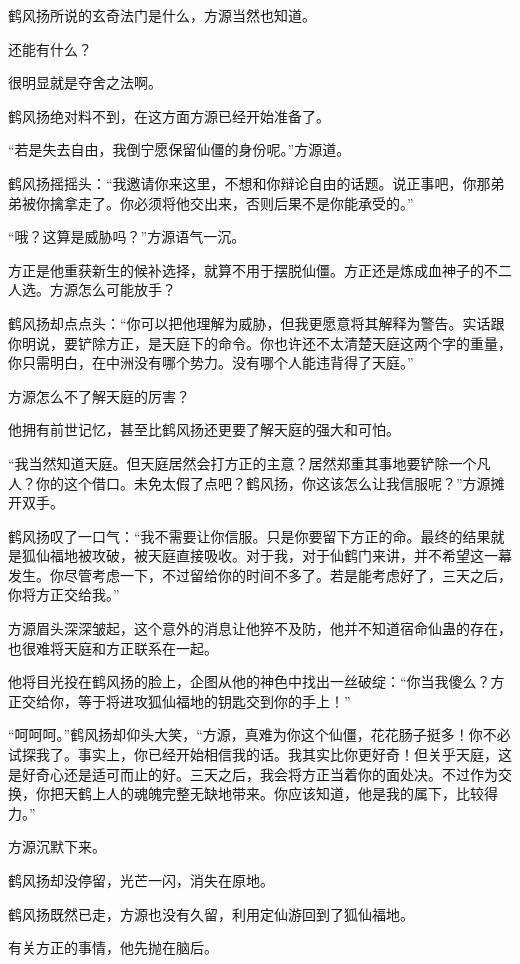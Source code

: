 \begin{this_body}
鹤风扬所说的玄奇法门是什么，方源当然也知道。

还能有什么？

很明显就是夺舍之法啊。

鹤风扬绝对料不到，在这方面方源已经开始准备了。

“若是失去自由，我倒宁愿保留仙僵的身份呢。”方源道。

鹤风扬摇摇头：“我邀请你来这里，不想和你辩论自由的话题。说正事吧，你那弟弟被你擒拿走了。你必须将他交出来，否则后果不是你能承受的。”

“哦？这算是威胁吗？”方源语气一沉。

方正是他重获新生的候补选择，就算不用于摆脱仙僵。方正还是炼成血神子的不二人选。方源怎么可能放手？

鹤风扬却点点头：“你可以把他理解为威胁，但我更愿意将其解释为警告。实话跟你明说，要铲除方正，是天庭下的命令。你也许还不太清楚天庭这两个字的重量，你只需明白，在中洲没有哪个势力。没有哪个人能违背得了天庭。”

方源怎么不了解天庭的厉害？

他拥有前世记忆，甚至比鹤风扬还更要了解天庭的强大和可怕。

“我当然知道天庭。但天庭居然会打方正的主意？居然郑重其事地要铲除一个凡人？你的这个借口。未免太假了点吧？鹤风扬，你这该怎么让我信服呢？”方源摊开双手。

鹤风扬叹了一口气：“我不需要让你信服。只是你要留下方正的命。最终的结果就是狐仙福地被攻破，被天庭直接吸收。对于我，对于仙鹤门来讲，并不希望这一幕发生。你尽管考虑一下，不过留给你的时间不多了。若是能考虑好了，三天之后，你将方正交给我。”

方源眉头深深皱起，这个意外的消息让他猝不及防，他并不知道宿命仙蛊的存在，也很难将天庭和方正联系在一起。

他将目光投在鹤风扬的脸上，企图从他的神色中找出一丝破绽：“你当我傻么？方正交给你，等于将进攻狐仙福地的钥匙交到你的手上！”

“呵呵呵。”鹤风扬却仰头大笑，“方源，真难为你这个仙僵，花花肠子挺多！你不必试探我了。事实上，你已经开始相信我的话。我其实比你更好奇！但关乎天庭，这是好奇心还是适可而止的好。三天之后，我会将方正当着你的面处决。不过作为交换，你把天鹤上人的魂魄完整无缺地带来。你应该知道，他是我的属下，比较得力。”

方源沉默下来。

鹤风扬却没停留，光芒一闪，消失在原地。

鹤风扬既然已走，方源也没有久留，利用定仙游回到了狐仙福地。

有关方正的事情，他先抛在脑后。


\end{this_body}
